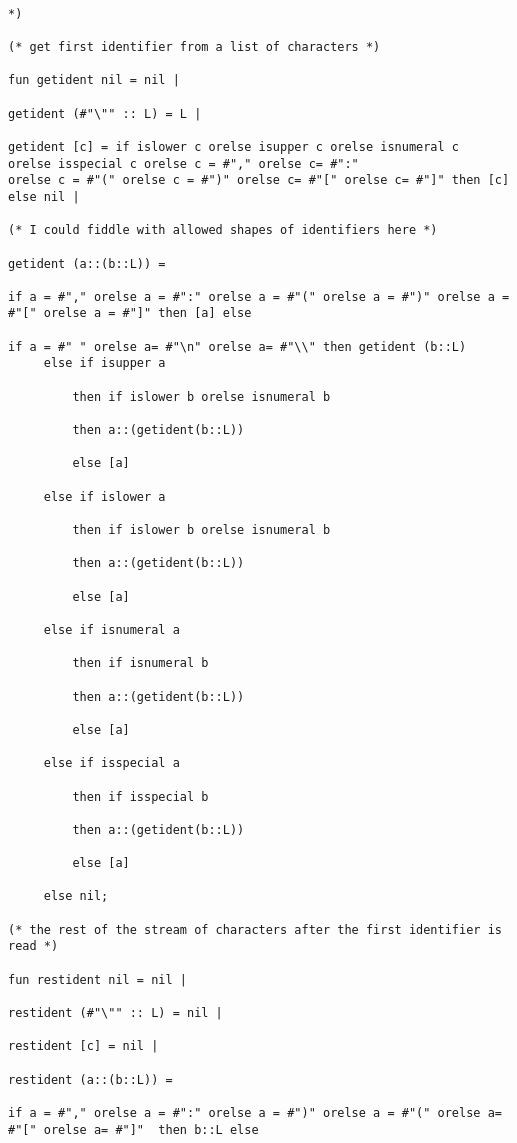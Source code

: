 \documentclass{article}
\begin{document}
\begin{verbatim}

*)

(* get first identifier from a list of characters *)

fun getident nil = nil |

getident (#"\"" :: L) = L |

getident [c] = if islower c orelse isupper c orelse isnumeral c 
orelse isspecial c orelse c = #"," orelse c= #":" 
orelse c = #"(" orelse c = #")" orelse c= #"[" orelse c= #"]" then [c] else nil |

(* I could fiddle with allowed shapes of identifiers here *)

getident (a::(b::L)) = 

if a = #"," orelse a = #":" orelse a = #"(" orelse a = #")" orelse a = #"[" orelse a = #"]" then [a] else
 
if a = #" " orelse a= #"\n" orelse a= #"\\" then getident (b::L)
     else if isupper a

         then if islower b orelse isnumeral b

         then a::(getident(b::L))

         else [a] 

     else if islower a

         then if islower b orelse isnumeral b

         then a::(getident(b::L))

         else [a]

     else if isnumeral a

         then if isnumeral b

         then a::(getident(b::L))

         else [a]

     else if isspecial a

         then if isspecial b

         then a::(getident(b::L))

         else [a]

     else nil;

(* the rest of the stream of characters after the first identifier is read *)

fun restident nil = nil |

restident (#"\"" :: L) = nil |

restident [c] = nil |

restident (a::(b::L)) = 

if a = #"," orelse a = #":" orelse a = #")" orelse a = #"(" orelse a= #"[" orelse a= #"]"  then b::L else


\end{verbatim}
\end{document}
